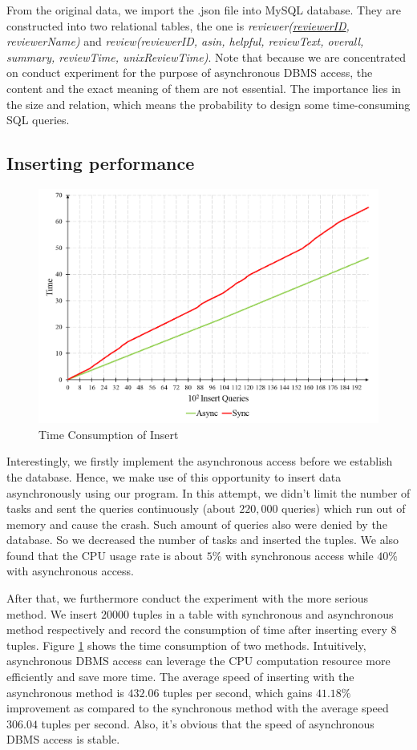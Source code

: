 \documentclass[onecolumn, conference, 12pt]{IEEEtran}
\begin{document}
	From the original data, we import the .json file into MySQL database. They are constructed into two relational tables, the one is \textit{reviewer(\underline{reviewerID}, reviewerName)} and \textit{review(reviewerID, asin, helpful, reviewText, overall, summary, reviewTime, unixReviewTime)}. Note that because we are concentrated on conduct experiment for the purpose of asynchronous DBMS access, the content and the exact meaning of them are not essential. The importance lies in the size and relation, which means the probability to design some time-consuming SQL queries.
	
	\subsection{Inserting performance}
	
	\begin{figure}[!t]
		\centering
		\includegraphics[width=6.5in]{fig/insert.png}
		\caption{Time Consumption of Insert}
		\label{fig_insert}
	\end{figure}
	Interestingly, we firstly implement the asynchronous access before we establish the database. Hence, we make use of this opportunity to insert data asynchronously using our program. In this attempt, we didn't limit the number of tasks and sent the queries continuously (about $ 220,000 $ queries) which run out of memory and cause the crash. Such amount of queries also were denied by the database. So we decreased the number of tasks and inserted the tuples. We also found that the CPU usage rate is about $ 5\% $ with synchronous access while $ 40\% $ with asynchronous access. 
	
	After that, we furthermore conduct the experiment with the more serious method. We insert $ 20000 $ tuples in a table with synchronous and asynchronous method respectively and record the consumption of time after inserting every 8 tuples. Figure \ref{fig_insert} shows the time consumption of two methods. Intuitively, asynchronous DBMS access can leverage the CPU computation resource more efficiently and save more time. The average speed of inserting with the asynchronous method is $ 432.06 $ tuples per second, which gains $ 41.18\% $ improvement as compared to the synchronous method with the average speed $ 306.04 $ tuples per second. Also, it’s obvious that the speed of asynchronous DBMS access is stable.
	
\end{document}

